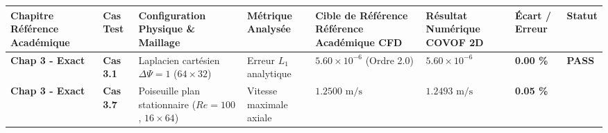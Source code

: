 \documentclass[
  french,
]{article}
\newcounter{none} %
\begin{document}
{\def\LTcaptype{none} %
\begin{longtable}[]{@{}
  >{\raggedright\arraybackslash}p{}
  >{\raggedright\arraybackslash}p{}
  >{\raggedright\arraybackslash}p{}
  >{\raggedright\arraybackslash}p{}
  >{\raggedright\arraybackslash}p{}
  >{\raggedright\arraybackslash}p{}
  >{\raggedright\arraybackslash}p{}
  >{\centering\arraybackslash}p{}@{}}
\toprule\noalign{}
\begin{minipage}[b]{\linewidth}\raggedright
Chapitre Référence Académique
\end{minipage} & \begin{minipage}[b]{\linewidth}\raggedright
Cas Test
\end{minipage} & \begin{minipage}[b]{\linewidth}\raggedright
Configuration Physique \& Maillage
\end{minipage} & \begin{minipage}[b]{\linewidth}\raggedright
Métrique Analysée
\end{minipage} & \begin{minipage}[b]{\linewidth}\raggedright
Cible de Référence Référence Académique CFD
\end{minipage} & \begin{minipage}[b]{\linewidth}\raggedright
Résultat Numérique COVOF 2D
\end{minipage} & \begin{minipage}[b]{\linewidth}\raggedright
Écart / Erreur
\end{minipage} & \begin{minipage}[b]{\linewidth}\centering
Statut
\end{minipage} \\
\midrule\noalign{}
\endhead
\bottomrule\noalign{}
\endlastfoot
\textbf{Chap 3 - Exact} & \textbf{Cas 3.1} & Laplacien cartésien
\(\Delta \Psi = 1\) (\(64 \times 32\)) & Erreur \(L_1\) analytique &
\(5.60 \times 10^{-6}\) (Ordre 2.0) & \(5.60 \times 10^{-6}\) &
\textbf{0.00 \%} & \textbf{PASS} \\
\textbf{Chap 3 - Exact} & \textbf{Cas 3.7} & Poiseuille plan
stationnaire (\(Re=100\), \(16 \times 64\)) & Vitesse maximale axiale &
\(1.2500\text{ m/s}\) & \(1.2493\text{ m/s}\) & \textbf{0.05 \%} &

\end{longtable}}
\end{document}
